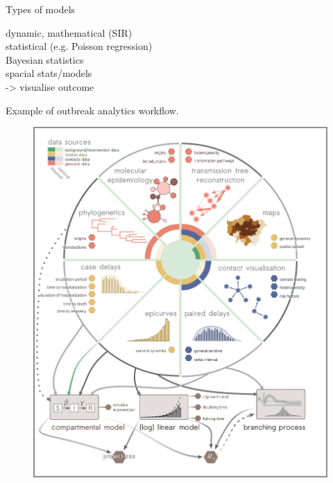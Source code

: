 \documentclass[table]{beamer}\usepackage[]{graphicx}\usepackage[]{color}
\begin{document}
\begin{frame}[fragile]{Types of models}

dynamic, mathematical (SIR) \\
statistical (e.g. Poisson regression) \\
Bayesian statistics \\
spacial stats/models \\

-> visualise outcome

\end{frame}


\begin{frame}[fragile]{Example of outbreak analytics workflow.}
\begin{center}
\begin{figure}
  \centering
  \includegraphics[width=\textwidth,height=0.8\textheight,keepaspectratio]{polonsky2019_Fig2.png}
\end{figure}
\end{center}
\end{frame}
\end{document}
